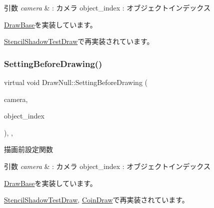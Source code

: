 \begin{DoxyParams}{引数}
{\em camera} & \+: カメラ object\+\_\+index \+: オブジェクトインデックス \\
\hline
\end{DoxyParams}


\mbox{\hyperlink{class_draw_base_afe64f27b0bbf8c45da7aa0de4c3f3d65}{Draw\+Base}}を実装しています。



\mbox{\hyperlink{class_stencil_shadow_test_draw_a68917115d3f151ed91ce297924ee5bbb}{Stencil\+Shadow\+Test\+Draw}}で再実装されています。

\mbox{\label{class_draw_null_a7f0d52c5c2fb2d9b8eb423f363862290}} 
\subsubsection{\texorpdfstring{Setting\+Before\+Drawing()}{SettingBeforeDrawing()}}
{\footnotesize\ttfamily virtual void Draw\+Null\+::\+Setting\+Before\+Drawing (\begin{DoxyParamCaption}\item[{\mbox{\hyperlink{class_camera}{Camera}} $\ast$}]{camera,  }\item[{unsigned}]{object\+\_\+index }\end{DoxyParamCaption})\hspace{0.3cm}{\ttfamily [inline]}, {\ttfamily [override]}, {\ttfamily [virtual]}}



描画前設定関数 


\begin{DoxyParams}{引数}
{\em camera} & \+: カメラ object\+\_\+index \+: オブジェクトインデックス \\
\hline
\end{DoxyParams}


\mbox{\hyperlink{class_draw_base_a3978252914ddde12197ea4577356bf25}{Draw\+Base}}を実装しています。



\mbox{\hyperlink{class_stencil_shadow_test_draw_a0f697b6dad67048c7f8916a53cca6b1c}{Stencil\+Shadow\+Test\+Draw}}, \mbox{\hyperlink{class_coin_draw_a66c03acd675ac1820977cb21015abfdb}{Coin\+Draw}}で再実装されています。

\mbox{\label{class_draw_null_a12d44e341c7364b5ab9cdd661dc16187}} 

